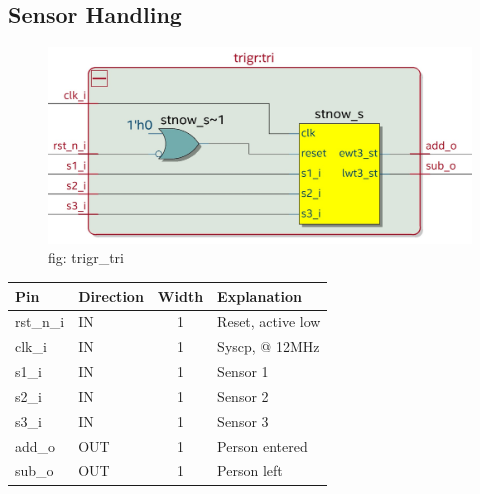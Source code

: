 \documentclass[12pt,a4 paper] {report}
\begin{document}
\subsection{Sensor Handling}
\begin{figure}[h]
	\centering	
	\includegraphics[scale=0.2]{../png/trigr_tri.png}
	\newline
	fig: trigr\_tri \\
\end{figure}
\begin{center}
	\begin{tabular}{| p{2cm} | p{2cm} | c| p{4cm} |}
		\hline
		Pin & Direction & Width & Explanation\\
		\hline	
rst\_n\_i  & IN & 1 & Reset, active low \\
\hline
clk\_i   & IN  & 1 & Syscp, @ 12MHz \\
\hline
s1\_i    & IN   & 1 &  Sensor 1 \\
\hline
s2\_i    & IN & 1 & Sensor 2\\
\hline
s3\_i  &  IN  & 1 &   Sensor 3 \\
\hline
add\_o   &  OUT  & 1 &  Person entered \\
\hline
sub\_o   & OUT & 1 &  Person left \\
\hline
	\end{tabular}
\end{center}
\newpage
\end{document}

